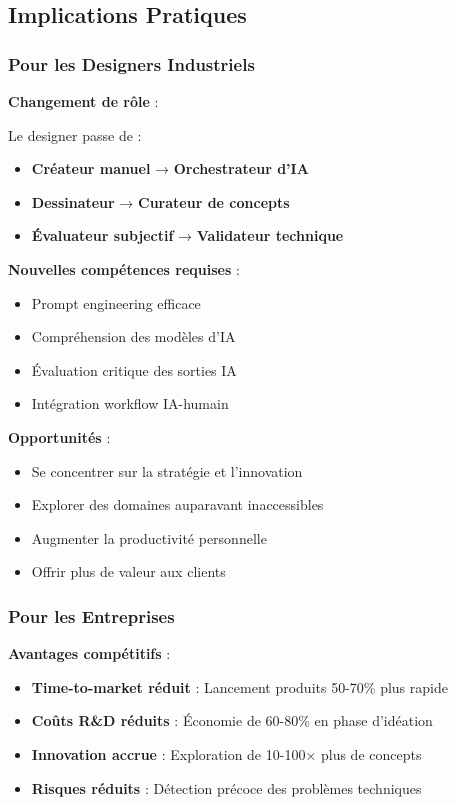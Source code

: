 \subsection{Implications Pratiques}

\subsubsection{Pour les Designers Industriels}

\textbf{Changement de rôle} :

Le designer passe de :
\begin{itemize}[leftmargin=*]
    \item \textbf{Créateur manuel} → \textbf{Orchestrateur d'IA}
    \item \textbf{Dessinateur} → \textbf{Curateur de concepts}
    \item \textbf{Évaluateur subjectif} → \textbf{Validateur technique}
\end{itemize}

\textbf{Nouvelles compétences requises} :
\begin{itemize}[leftmargin=*]
    \item Prompt engineering efficace
    \item Compréhension des modèles d'IA
    \item Évaluation critique des sorties IA
    \item Intégration workflow IA-humain
\end{itemize}

\textbf{Opportunités} :
\begin{itemize}[leftmargin=*]
    \item Se concentrer sur la stratégie et l'innovation
    \item Explorer des domaines auparavant inaccessibles
    \item Augmenter la productivité personnelle
    \item Offrir plus de valeur aux clients
\end{itemize}

\subsubsection{Pour les Entreprises}

\textbf{Avantages compétitifs} :
\begin{itemize}[leftmargin=*]
    \item \textbf{Time-to-market réduit} : Lancement produits 50-70\% plus rapide
    \item \textbf{Coûts R\&D réduits} : Économie de 60-80\% en phase d'idéation
    \item \textbf{Innovation accrue} : Exploration de 10-100× plus de concepts
    \item \textbf{Risques réduits} : Détection précoce des problèmes techniques
\end{itemize}

